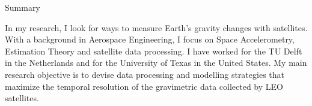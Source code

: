 
\begin{cvtext}{Summary}






In my research, I look for ways to measure Earth's gravity changes with satellites.
With a background in Aerospace Engineering, I focus on Space Accelerometry, Estimation Theory and satellite data processing.
I have worked for the TU Delft in the Netherlands and for the University of Texas in the United States.
My main research objective is to devise data processing and modelling strategies that maximize the temporal resolution of the gravimetric data collected by LEO satellites.


\end{cvtext}
